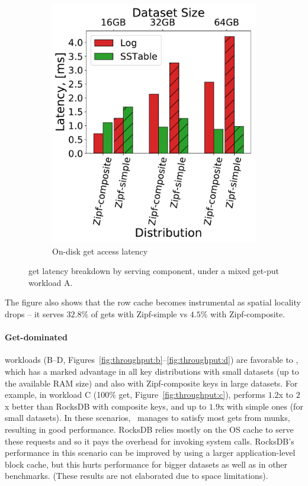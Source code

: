 \begin{figure}[htb]
\begin{subfigure}{0.6\linewidth}
\includegraphics[width=\textwidth]{figs/Latency_A.pdf}
\caption{On-disk get access latency}
\label{fig:readstat:lat}
\end{subfigure}
\caption{{\sys\/ get latency breakdown by serving component, under a mixed get-put workload A.}}
\label{fig:readstat}
\end{figure}

The figure also shows that the row cache becomes instrumental as spatial locality drops -- it serves $32.8\%$ of gets with Zipf-simple 
vs $4.5\%$ with Zipf-composite. 

\paragraph{ Get-dominated} 
workloads (B--D, Figures~\ref{fig:throughput:b}--\ref{fig:throughput:d}) are 
favorable to 
\sys, which has a marked advantage in all key distributions with small datasets (up to the available RAM size) 
and also with Zipf-composite keys in large datasets. 
For example, in workload C (100\% get, Figure~\ref{fig:throughput:c}), 
\sys\/ performs $1.2$x to $2$x better than RocksDB with composite keys,
and up to $1.9$x  with simple ones (for small datasets). 
In these scenarios, \sys\  manages to satisfy most gets from munks, resulting in good performance.
RocksDB relies mostly on the OS cache to serve these requests and so it pays the overhead for invoking system calls. 
RocksDB's performance in this scenario can be improved by 
using a larger application-level block cache,
but this hurts performance for bigger datasets as well as in other benchmarks.
(These results are not elaborated due to space limitations). 

